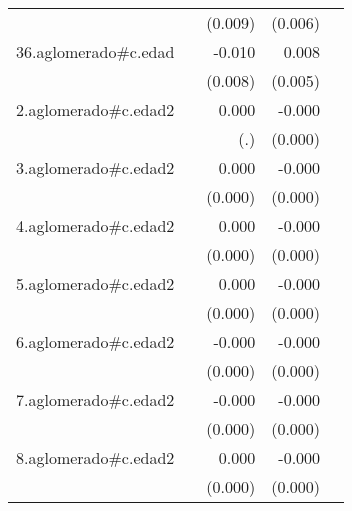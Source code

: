 {\begin{longtable}{l*{4}{D{.}{.}{-1}}}
            &                     &     (0.009)         &     (0.006)         &                     \\
\addlinespace
36.aglomerado#c.edad&                     &      -0.010         &       0.008         &                     \\
            &                     &     (0.008)         &     (0.005)         &                     \\
\addlinespace
2.aglomerado#c.edad2&                     &       0.000         &      -0.000\sym{*}  &                     \\
            &                     &         (.)         &     (0.000)         &                     \\
\addlinespace
3.aglomerado#c.edad2&                     &       0.000         &      -0.000\sym{*}  &                     \\
            &                     &     (0.000)         &     (0.000)         &                     \\
\addlinespace
4.aglomerado#c.edad2&                     &       0.000         &      -0.000\sym{**} &                     \\
            &                     &     (0.000)         &     (0.000)         &                     \\
\addlinespace
5.aglomerado#c.edad2&                     &       0.000         &      -0.000         &                     \\
            &                     &     (0.000)         &     (0.000)         &                     \\
\addlinespace
6.aglomerado#c.edad2&                     &      -0.000         &      -0.000\sym{***}&                     \\
            &                     &     (0.000)         &     (0.000)         &                     \\
\addlinespace
7.aglomerado#c.edad2&                     &      -0.000         &      -0.000\sym{**} &                     \\
            &                     &     (0.000)         &     (0.000)         &                     \\
\addlinespace
8.aglomerado#c.edad2&                     &       0.000         &      -0.000         &                     \\
            &                     &     (0.000)         &     (0.000)         &                     \\

\end{longtable}}
